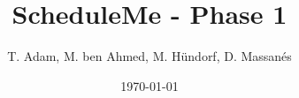 \documentclass[aspectratio=169]{beamer}
\title[ScheduleMe]{ScheduleMe - Phase 1} %
\author{T. Adam, M. ben Ahmed, M. Hündorf, D. Massanés} %
\institute[UOS] %
{

Universität Osnabrück \\ %

\medskip
\textit{Ressourcenbeschränkte Projektplanung} %


}
\date{\today} %
\begin{document}
\begin{frame}
\titlepage %
\end{frame}




%	
\end{document}
